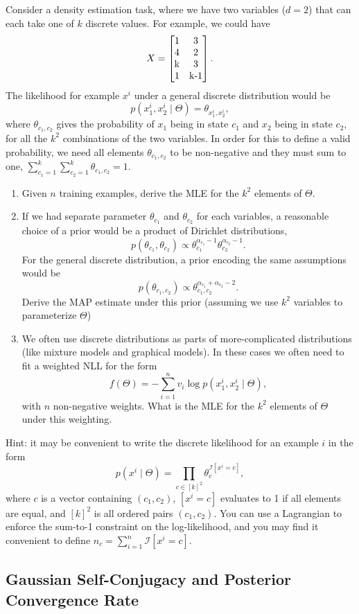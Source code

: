 \documentclass{article}
\def\blu#1{{\color{blu}#1}}
\newcommand{\mat}[1]{\begin{bmatrix}#1\end{bmatrix}}
\def\cond{\; | \;}
\def\enum#1{\begin{enumerate}#1\end{enumerate}}
\begin{document}
Consider a density estimation task, where we have two variables ($d=2$) that can each take one of $k$ discrete values. For example, we could have
\[
X = \mat{1 & 3\\4 & 2\\$k$ & 3\\1 & $k-1$}.
\]
The likelihood for example $x^i$ under a general discrete distribution would be
\[
p(x^i_1, x^i_2 \cond \Theta) = \theta_{x_1^i,x_2^i},
\]
where $\theta_{c_1,c_2}$ gives the probability of $x_1$ being in state $c_1$ and $x_2$ being in state $c_2$, for all the $k^2$ combinations of the two variables. In order for this to define a valid probability, we need all elements $\theta_{c_1,c_2}$ to be non-negative and they must sum to one, $\sum_{c_1=1}^k\sum_{c_2=1}^k \theta_{c_1,c_2} = 1$.
\enum{
\item Given $n$ training examples, \blu{derive the MLE for the $k^2$ elements of $\Theta$}.
\item If we had separate parameter $\theta_{c_1}$ and $\theta_{c_2}$ for each variables, a reasonable choice of a prior would be a product of Dirichlet distributions,
\[
p(\theta_{c_1},\theta_{c_2}) \propto \theta_{c_1}^{\alpha_{c_1} - 1}\theta_{c_2}^{\alpha_{c_2} - 1}.
\]
For the general discrete distribution, a prior encoding the same assumptions  would be
\[
p(\theta_{c_1,c_2}) \propto \theta_{c_1,c_2}^{\alpha_{c_1} + \alpha_{c_2} - 2}.
\]
\blu{Derive the MAP estimate under this prior} (assuming we use $k^2$ variables to parameterize $\Theta$)
\item We often use discrete distributions as parts of more-complicated distributions (like mixture models and graphical models). In these cases we often need to fit a weighted NLL for the form
\[
f(\Theta) = -\sum_{i=1}^n v_i \log p(x_1^i, x_2^i \cond \Theta),
\]
with $n$ non-negative weights. \blu{What is the MLE for the $k^2$ elements of $\Theta$ under this weighting.}
}
Hint: it may be convenient to write the discrete likelihood for an example $i$ in the form
\[
p(x^i \cond \Theta) = \prod_{c \in [k]^2}\theta_c^{\mathcal{I}[x^i = c]},
\]
where $c$ is a vector containing $(c_1,c_2)$, $[x^i = c]$ evaluates to 1 if all elements are equal, and $[k]^2$ is all ordered pairs $(c_1,c_2)$. You can use a Lagrangian to enforce the sum-to-1 constraint on the log-likelihood, and you may find it convenient to define $n_c = \sum_{i=1}^n \mathcal{I}[x^i = c]$.



\subsection{Gaussian Self-Conjugacy and Posterior Convergence Rate}
\end{document}
